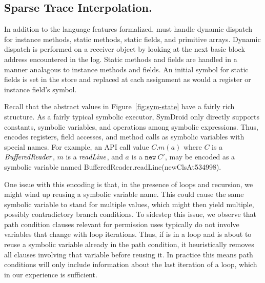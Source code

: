 

\subsection{Sparse Trace Interpolation.}

In addition to the language features formalized, \hogarth{} must
handle dynamic dispatch for instance methods, static methods, static
fields, and primitive arrays.  Dynamic dispatch is performed on a
receiver object by looking at the next basic block address encountered
in the log.  Static
methods and fields are handled in a manner analagous to instance
methods and fields.  An initial symbol for static fields is set in the
store and replaced at each assignment as would a register or instance
field's symbol.

Recall that the abstract values in Figure~\ref{fig:sym-state} have a
fairly rich structure. As a fairly typical symbolic executor, SymDroid
only directly supports constants, symbolic variables, and operations
among symbolic expressions. Thus, \hogarth{} encodes registers, field accesses,
and method calls as symbolic variables with special names. For
example, an API call value $C.m(a)$ where $C$ is a $\mathit{BufferedReader}$,
$m$ is a $\mathit{readLine}$, and $a$ is a $\texttt{new}\ C'$, may be
encoded as a symbolic variable named
\textsf{BufferedReader.readLine(newClsAt534998)}.

One issue with this encoding is that, in the presence of loops and
recursion, we might wind up reusing a symbolic variable name. This
could cause the same symbolic variable to stand for multiple values,
which might then yield multiple, possibly contradictory branch
conditions. To sidestep this issue, we observe that path condition
clauses relevant for permission uses typically do not involve
variables that change with loop iterations. Thus, if \hogarth{} is in
a loop and is about to reuse a symbolic variable already in the path
condition, it heuristically removes all clauses involving that
variable before reusing it. In practice this means path conditions
will only include information about the last iteration of a loop,
which in our experience is sufficient.

